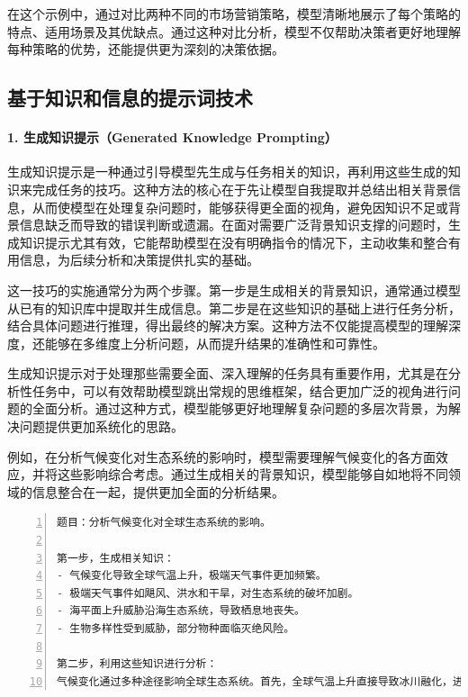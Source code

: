在这个示例中，通过对比两种不同的市场营销策略，模型清晰地展示了每个策略的特点、适用场景及其优缺点。通过这种对比分析，模型不仅帮助决策者更好地理解每种策略的优势，还能提供更为深刻的决策依据。

\subsection{基于知识和信息的提示词技术}

\paragraph{1. 生成知识提示（Generated Knowledge Prompting）} 

生成知识提示是一种通过引导模型先生成与任务相关的知识，再利用这些生成的知识来完成任务的技巧。这种方法的核心在于先让模型自我提取并总结出相关背景信息，从而使模型在处理复杂问题时，能够获得更全面的视角，避免因知识不足或背景信息缺乏而导致的错误判断或遗漏。在面对需要广泛背景知识支撑的问题时，生成知识提示尤其有效，它能帮助模型在没有明确指令的情况下，主动收集和整合有用信息，为后续分析和决策提供扎实的基础。

这一技巧的实施通常分为两个步骤。第一步是生成相关的背景知识，通常通过模型从已有的知识库中提取并生成信息。第二步是在这些知识的基础上进行任务分析，结合具体问题进行推理，得出最终的解决方案。这种方法不仅能提高模型的理解深度，还能够在多维度上分析问题，从而提升结果的准确性和可靠性。

生成知识提示对于处理那些需要全面、深入理解的任务具有重要作用，尤其是在分析性任务中，可以有效帮助模型跳出常规的思维框架，结合更加广泛的视角进行问题的全面分析。通过这种方式，模型能够更好地理解复杂问题的多层次背景，为解决问题提供更加系统化的思路。

例如，在分析气候变化对生态系统的影响时，模型需要理解气候变化的各方面效应，并将这些影响综合考虑。通过生成相关的背景知识，模型能够自如地将不同领域的信息整合在一起，提供更加全面的分析结果。



\begin{lstlisting}[language={python},label={},caption={}, basicstyle=\footnotesize\ttfamily, breaklines=true, numbers=left, frame=single]
题目：分析气候变化对全球生态系统的影响。

第一步，生成相关知识：
- 气候变化导致全球气温上升，极端天气事件更加频繁。
- 极端天气事件如飓风、洪水和干旱，对生态系统的破坏加剧。
- 海平面上升威胁沿海生态系统，导致栖息地丧失。
- 生物多样性受到威胁，部分物种面临灭绝风险。

第二步，利用这些知识进行分析：
气候变化通过多种途径影响全球生态系统。首先，全球气温上升直接导致冰川融化，进而导致海平面上升，威胁到沿海地区的生态环境。其次，随着极端天气事件的增加，如飓风、洪水、干旱等，这些自然灾害不断破坏动植物的栖息地，迫使许多物种迁移或面临灭绝的风险。此外，气候变化还加剧了生物多样性的减少，许多物种在气候变化的压力下无法适应新环境，导致生态平衡的进一步失衡。温度的升高以及栖息地的减少使得生态系统中的物种迁移受到限制，生态功能也遭到破坏。这些变化不仅对自然环境造成严重威胁，也影响到人类社会的各个方面，如农业生产、经济发展以及人类健康等。
\end{lstlisting}

